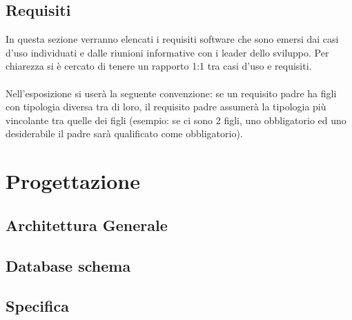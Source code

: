 \documentclass[a4paper,13pt,twoside]{article}
\begin{document}
\subsection{Requisiti} \label{sec:req}
In questa sezione verranno elencati i requisiti software che sono emersi dai casi d'uso individuati e dalle riunioni informative con i leader dello sviluppo. Per chiarezza si è cercato di tenere un rapporto 1:1 tra casi d'uso e requisiti.
 \\ \\Nell'esposizione si userà la seguente convenzione: se un requisito padre ha figli con tipologia diversa tra di loro, il requisito padre assumerà la tipologia più vincolante tra quelle dei figli (esempio: se ci sono 2 figli, uno obbligatorio ed uno desiderabile il padre sarà qualificato come obbligatorio).
 

\newpage

\newpage

\section{Progettazione} \label{sec:progett}
\subsection{Architettura Generale} \label{sec:archgen}

\subsection{Database schema} \label{sec:dbschema}

\subsection{Specifica} \label{sec:specifica}





\newpage

%
%


%

\appendix
%
%
%
\end{document}
